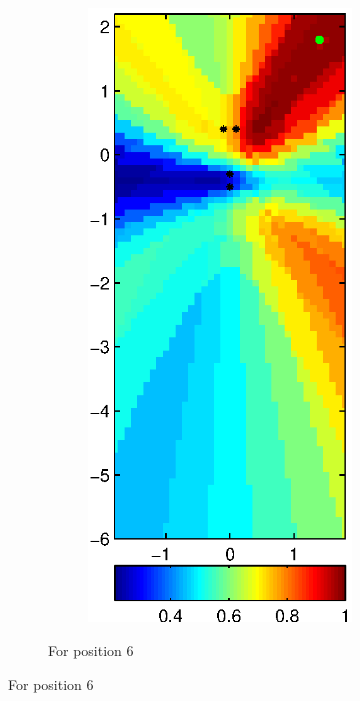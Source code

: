\documentclass[spanish,openright]{book}
\newcommand{\verticalSpacingSRPMaps}{-0.3cm}
\begin{document}
\begin{figure}
\begin{subfigure}[t]{0.47\textwidth}
\begin{minipage}[t]{\textwidth}
\begin{subfigure}[t]{0.3\textwidth}
\label{fig:SRP_pos06}
\end{subfigure}
\begin{subfigure}[t]{0.3\textwidth}
\includegraphics[width=\textwidth]{SRP_Fo1500_mean_pos06}
\label{fig:SRP_Fo1500_mean_pos06}
\end{subfigure}
\vspace{\verticalSpacingSRPMaps}
\caption{\centering For position 6}
\vspace{0.25cm}
\end{minipage}
\end{subfigure}


\end{figure}
\end{document}
